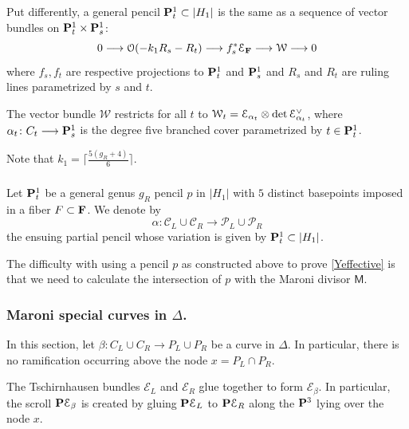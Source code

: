 \documentclass[reqno, 10 pt]{article}
\theoremstyle{definition}
\theoremstyle{remark}
\numberwithin{equation}{section}
\numberwithin{thm}{section}
\numberwithin{prop}{section}
\numberwithin{lem}{section}
\numberwithin{cor}{section}
\numberwithin{conj}{section}
\numberwithin{defn}{section}
\newcommand{\F}{{\mathbf F}}
\renewcommand{\to}{\longrightarrow}
\newcommand{\sfM}{{\mathsf M}}
\newcommand{\cC}{{\mathcal C}}
\newcommand{\cE}{{\mathcal E}}
\newcommand{\cO}{{\mathcal O}}
\newcommand{\cP}{{\mathcal P}}
\newcommand{\cW}{{\mathcal W}}
\renewcommand{\P}{{\bf P}}
\renewcommand{\F}{{\bf F}}
\newcommand {\from}{{\colon}}
\begin{document}
\subsubsection{}
Put differently, a general pencil $\P^{1}_{t} \subset |H_{1}|$ is the same as a sequence of vector bundles on $\P^{1}_{t} \times \P^{1}_{s}$: 
 \begin{equation}
0 \to \cO(-k_{1}R_s-R_t) \longrightarrow f_{s}^*\cE_{\F} \longrightarrow \cW \longrightarrow 0
 \end{equation}
 where $f_{s}, f_{t}$ are respective projections to $\P^{1}_{t}$ and $\P^{1}_{s}$ and $R_{s}$ and $R_{t}$ are ruling lines parametrized by $s$ and $t$.

 The vector bundle $\cW$ restricts for all $t$ to $\cW_{t} = \cE_{\alpha_{t}} \otimes \det \dual{\cE_{\alpha_{t}}}$, where $\alpha_{t} \from C_{t} \to \P^{1}_{s}$ is the degree five branched cover parametrized by $t \in \P^{1}_{t}$.

 Note that $k_{1} = \lceil \frac{5(g_{R}+4)}{6} \rceil$.

\subsubsection{}\label{pentagonalpencil} Let $\P^{1}_{t}$ be a general genus $g_{R}$ pencil $p$ in $|H_{1}|$ with $5$ distinct basepoints imposed in a fiber $F \subset \F$.  We denote by $$\alpha \from \cC_{L} \cup \cC_{R} \to \cP_{L} \cup \cP_{R}$$ the ensuing partial pencil whose variation is given by $\P^{1}_{t} \subset |H_{1}|$.




The difficulty with using a pencil $p$ as constructed above to prove \autoref{Yeffective} is that we need to calculate the intersection of $p$ with the Maroni divisor $\sfM$. 


\subsubsection{Maroni special curves in $\Delta$.}\label{Maronispecialanalysis} In this section, let $\beta \from C_{L} \cup C_{R} \to P_{L} \cup P_{R}$ be a curve in $\Delta$.  In particular, there is no ramification occurring above the node $x = P_{L} \cap P_{R}$. 

The Tschirnhausen bundles $\cE_{L}$ and $\cE_{R}$ glue together to form $\cE_{\beta}$.  In particular, the scroll $\P\cE_{\beta}$ is created by gluing $\P\cE_{L}$ to $\P\cE_{R}$ along the $\P^{3}$ lying over the node $x$.
\end{document}
